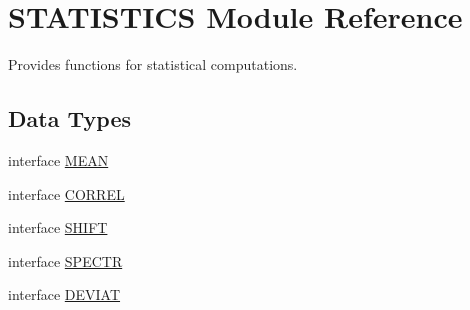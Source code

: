 \hypertarget{namespaceSTATISTICS}{
\section{STATISTICS Module Reference}
\label{namespaceSTATISTICS}
}


Provides functions for statistical computations.  


\subsection*{Data Types}
\begin{DoxyCompactItemize}
\item 
interface \hyperlink{interfaceSTATISTICS_1_1MEAN}{MEAN}
\item 
interface \hyperlink{interfaceSTATISTICS_1_1CORREL}{CORREL}
\item 
interface \hyperlink{interfaceSTATISTICS_1_1SHIFT}{SHIFT}
\item 
interface \hyperlink{interfaceSTATISTICS_1_1SPECTR}{SPECTR}
\item 
interface \hyperlink{interfaceSTATISTICS_1_1DEVIAT}{DEVIAT}
\end{DoxyCompactItemize}
